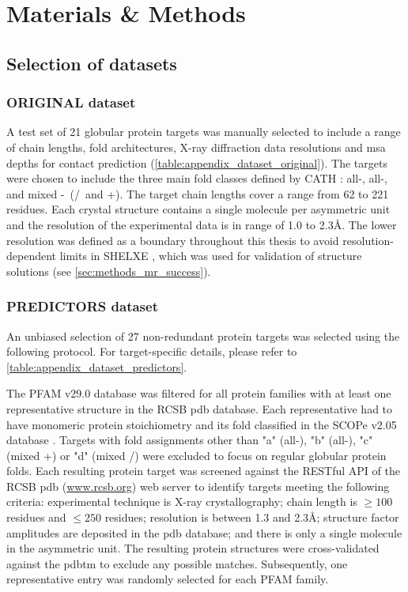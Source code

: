 \chapter{Materials \& Methods}
\clearpage

\section{Selection of datasets}
\subsection{ORIGINAL dataset} \label{sec:methods_dataset_original}
A test set of 21 globular protein targets was manually selected to include a range of chain lengths, fold architectures, X-ray diffraction data resolutions and \gls{msa} depths for contact prediction  (\cref{table:appendix_dataset_original}). The targets were chosen to include the three main fold classes defined by CATH \cite{Orengo1997-fj}: all-\textalpha, all-\textbeta, and mixed \textalpha-\textbeta\ (\textalpha/\textbeta\ and \textalpha+\textbeta). The target chain lengths cover a range from 62 to 221 residues. Each crystal structure contains a single molecule per asymmetric unit and the resolution of the experimental data is in range of 1.0 to 2.3\AA. The lower resolution was defined as a boundary throughout this thesis to avoid resolution-dependent limits in SHELXE \cite{Thorn2013-le}, which was used for validation of structure solutions (see \cref{sec:methods_mr_success}).

\subsection{PREDICTORS dataset} \label{sec:methods_dataset_predictors}
An unbiased selection of 27 non-redundant protein targets was selected using the following protocol. For target-specific details, please refer to \cref{table:appendix_dataset_predictors}.

The PFAM v29.0 \cite{Finn2016-zo} database was filtered for all protein families with at least one representative structure in the RCSB \gls{pdb} \cite{Berman2000-ua} database. Each representative had to have monomeric protein stoichiometry and its fold classified in the SCOPe v2.05 database \cite{Chandonia2017-vf}. Targets with fold assignments other than "a" (all-\textalpha), "b" (all-\textbeta), "c" (mixed \textalpha+\textbeta) or "d" (mixed \textalpha/\textbeta) were excluded to focus on regular globular protein folds. Each resulting protein target was screened against the RESTful API of the RCSB \gls{pdb} (\url{www.rcsb.org}) web server to identify targets meeting the following criteria: experimental technique is X-ray crystallography; chain length is $\geq100$ residues and $\leq250$ residues; resolution is between 1.3 and 2.3\AA; structure factor amplitudes are deposited in the \gls{pdb} \cite{Berman2000-ua} database; and there is only a single molecule in the asymmetric unit. The resulting protein structures were cross-validated against the \gls{pdbtm} \cite{Tusnady2005-ns} to exclude any possible matches. Subsequently, one representative entry was randomly selected for each PFAM family.

